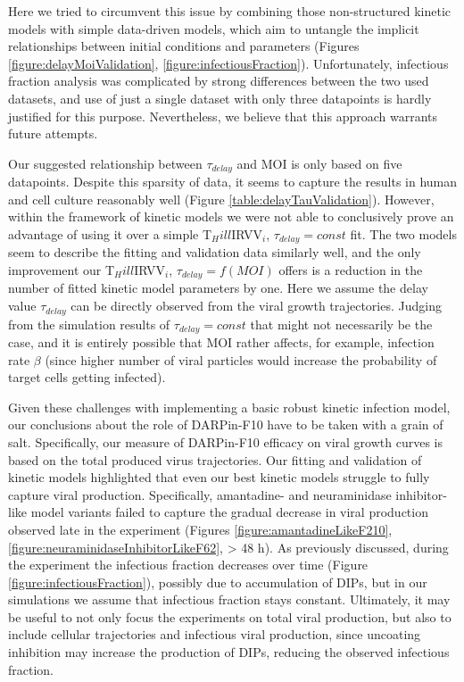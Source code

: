 Here we tried to circumvent this issue by combining those non-structured kinetic models with simple data-driven models, which aim to untangle the implicit relationships between initial conditions and parameters (Figures \ref{figure:delayMoiValidation}, \ref{figure:infectiousFraction}). Unfortunately, infectious fraction analysis was complicated by strong differences between the two used datasets, and use of just a single dataset with only three datapoints is hardly justified for this purpose. Nevertheless, we believe that this approach warrants future attempts.

Our suggested relationship between $\tau_{delay}$ and MOI is only based on five datapoints. Despite this sparsity of data, it seems to capture the results in human and cell culture reasonably well (Figure \ref{table:delayTauValidation}). However, within the framework of kinetic models we were not able to conclusively prove an advantage of using it over a simple T$_Hill$IRVV$_i$, $\tau_{delay} = const$ fit. The two models seem to describe the fitting and validation data similarly well, and the only improvement our T$_Hill$IRVV$_i$, $\tau_{delay} = f(MOI)$ offers is a reduction in the number of fitted kinetic model parameters by one. Here we assume the delay value $\tau_{delay}$ can be directly observed from the viral growth trajectories. Judging from the simulation results of $\tau_{delay} = const$ that might not necessarily be the case, and it is entirely possible that MOI rather affects, for example, infection rate $\beta$ (since higher number of viral particles would increase the probability of target cells getting infected). 

Given these challenges with implementing a basic robust kinetic infection model, our conclusions about the role of DARPin-F10 have to be taken with a grain of salt. Specifically, our measure of DARPin-F10 efficacy on viral growth curves is based on the total produced virus trajectories. Our fitting and validation of kinetic models highlighted that even our best kinetic models struggle to fully capture viral production. Specifically, amantadine- and neuraminidase inhibitor-like model variants failed to capture the gradual decrease in viral production observed late in the experiment (Figures \ref{figure:amantadineLikeF210}, \ref{figure:neuraminidaseInhibitorLikeF62}, > 48 h). As previously discussed, during the experiment the infectious fraction decreases over time (Figure \ref{figure:infectiousFraction}), possibly due to accumulation of DIPs, but in our simulations we assume that infectious fraction stays constant. Ultimately, it may be useful to not only focus the experiments on total viral production, but also to include cellular trajectories and infectious viral production, since uncoating inhibition may increase the production of DIPs, reducing the observed infectious fraction.

